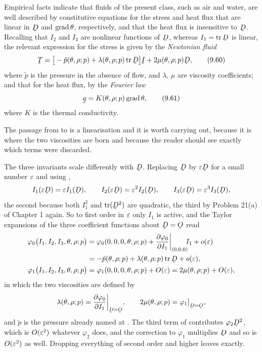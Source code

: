 Empirical facts indicate that fluids of the present class, such as air
and water, are well described by constitutive equations for the stress
and heat flux that are linear in $\bD$ and $\operatorname{grad}\theta$, respectively,
and that the heat flux is insensitive to $\bD$. Recalling that $I_{2}$
and $I_{3}$ are nonlinear functions of $\bD$, whereas $I_{1}=\tr\bD$ is
linear, the relevant expression for the stress is given by the
\emph{Newtonian fluid}
\begin{equation}
   \bT=\big[-\tilde p(\theta,\rho;p)+\lambda(\theta,\rho;p)\tr\bD\big]\I
   +2\mu(\theta,\rho;p)\bD,
   \tag{9.60}\label{eq:9.60}
\end{equation}
where $\tilde p$ is the pressure in the absence of flow, and $\lambda$,
$\mu$ are viscosity coefficients; and that for the heat flux, by the
\emph{Fourier law}
\begin{equation}
   \bq=K(\theta,\rho;p)\grad\theta,
   \tag{9.61}\label{eq:9.61}
\end{equation}
where $K$ is the thermal conductivity.

The passage from  to  is a linearisation and it is
worth carrying out, because it is where the two viscosities are born and
because the reader should see exactly which terms were discarded.

The three invariants scale differently with $\bD$. Replacing $\bD$ by
$\eps\bD$ for a small number $\varepsilon$ and using ,
\[
   I_{1}(\eps\bD)=\eps I_{1}(\bD),\qquad
   I_{2}(\eps\bD)=\eps^{2}I_{2}(\bD),\qquad
   I_{3}(\eps\bD)=\eps^{3}I_{3}(\bD),
\]
the second because both $I_{1}^{2}$ and $\tr(\bD^{2})$ are quadratic,
the third by Problem 21(a) of Chapter 1 again. So to first order in
$\varepsilon$ only $I_{1}$ is active, and the Taylor expansions of the three
coefficient functions about $\bD=\Ob$ read
\[
\begin{aligned}
   \varphi_{0}\big(I_{1},I_{2},I_{3},\theta,\rho;p\big)
     &=\varphi_{0}(0,0,0,\theta,\rho;p)
      +\frac{\partial\varphi_{0}}{\partial I_{1}}
       \bigg|_{(0,0,0)}\!\!I_{1}+o(\eps)\\
     &=-\tilde p(\theta,\rho;p)+\lambda(\theta,\rho;p)\tr\bD+o(\eps),\\
   \varphi_{1}\big(I_{1},I_{2},I_{3},\theta,\rho;p\big)
     &=\varphi_{1}(0,0,0,\theta,\rho;p)+O(\eps)
      =2\mu(\theta,\rho;p)+O(\eps),
\end{aligned}
\]
in which the two viscosities are defined by
\[
   \lambda(\theta,\rho;p)
   =\frac{\partial\varphi_{0}}{\partial I_{1}}\bigg|_{\bD=\Ob},
   \qquad
   2\mu(\theta,\rho;p)=\varphi_{1}\rest{\bD=\Ob},
\]
and $\tilde p$ is the pressure already named at . The third
term of  contributes $\varphi_{2}\bD^{2}$, which is
$O(\varepsilon^{2})$ whatever $\varphi_{2}$ does, and the correction to
$\varphi_{1}$ multiplies $\bD$ and so is $O(\varepsilon^{2})$ as well.
Dropping everything of second order and higher leaves 
exactly.

